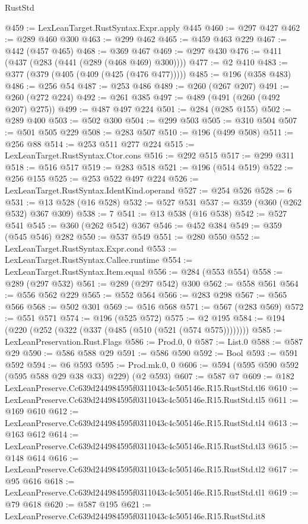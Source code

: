 \begin{lexlean}{RustStd}
\begin{coremodule}
@459 := LexLeanTarget.RustSyntax.Expr.apply @445
@460 := @297 @427
@462 := @289 @460 @300
@463 := @299 @462
@465 := @459 @463 @229
@467 := @442 (@457 @465)
@468 := @369 @467
@469 := @297 @430
@476 := @411 (@437 (@283 (@441 (@289 (@468 @469) @300))))
@477 := @2 @410
@483 := @377 (@379 (@405 (@409 (@425 (@476 @477)))))
@485 := @196 (@358 @483)
@486 := @256 @54
@487 := @253 @486
@489 := @260 (@267 @207)
@491 := @260 (@272 @224)
@492 := @261 @385
@497 := @489 (@491 (@260 (@492 @207) @275))
@499 := @487 @497 @224
@501 := @284 (@285 @155)
@502 := @289 @400
@503 := @502 @300
@504 := @299 @503
@505 := @310 @504
@507 := @501 @505 @229
@508 := @283 @507
@510 := @196 (@499 @508)
@511 := @256 @88
@514 := @253 @511 @277 @224
@515 := LexLeanTarget.RustSyntax.Ctor.cons
@516 := @292 @515
@517 := @299 @311
@518 := @516 @517
@519 := @283 @518
@521 := @196 (@514 @519)
@522 := @256 @155
@525 := @253 @522 @497 @224
@526 := LexLeanTarget.RustSyntax.IdentKind.operand
@527 := @254 @526
@528 := 6
@531 := @13 @528 (@16 @528)
@532 := @527 @531
@537 := @359 (@360 (@262 @532) @367 @309)
@538 := 7
@541 := @13 @538 (@16 @538)
@542 := @527 @541
@545 := @360 (@262 @542) @367
@546 := @452 @384
@549 := @359 (@545 @546) @282
@550 := @537 @549
@551 := @280 @550
@552 := LexLeanTarget.RustSyntax.Expr.cond
@553 := LexLeanTarget.RustSyntax.Callee.runtime
@554 := LexLeanTarget.RustSyntax.Item.equal
@556 := @284 (@553 @554)
@558 := @289 (@297 @532)
@561 := @289 (@297 @542) @300
@562 := @558 @561
@564 := @556 @562 @229
@565 := @552 @564
@566 := @283 @298
@567 := @565 @566
@568 := @502 @301
@569 := @516 @568
@571 := @567 (@283 @569)
@572 := @551 @571
@574 := @196 (@525 @572)
@575 := @2 @195
@584 := @194 (@220 (@252 (@322 (@337 (@485 (@510 (@521 (@574 @575))))))))
@585 := LexLeanPreservation.Rust.Flags
@586 := Prod.{0, 0}
@587 := List.{0}
@588 := @587 @29
@590 := @586 @588 @29
@591 := @586 @590
@592 := Bool
@593 := @591 @592
@594 := @6 @593
@595 := Prod.mk.{0, 0}
@606 := @594 (@595 @590 @592 (@595 @588 @29 @38 @33) @229) (@2 @593)
@607 := @587 @7
@609 := @182 LexLeanPreserve.Cc639d244984595f0311043c4c505146e.R15.RustStd.tl6
@610 := LexLeanPreserve.Cc639d244984595f0311043c4c505146e.R15.RustStd.tl5
@611 := @169 @610
@612 := LexLeanPreserve.Cc639d244984595f0311043c4c505146e.R15.RustStd.tl4
@613 := @163 @612
@614 := LexLeanPreserve.Cc639d244984595f0311043c4c505146e.R15.RustStd.tl3
@615 := @148 @614
@616 := LexLeanPreserve.Cc639d244984595f0311043c4c505146e.R15.RustStd.tl2
@617 := @95 @616
@618 := LexLeanPreserve.Cc639d244984595f0311043c4c505146e.R15.RustStd.tl1
@619 := @79 @618
@620 := @587 @195
@621 := LexLeanPreserve.Cc639d244984595f0311043c4c505146e.R15.RustStd.it8

\end{coremodule}
\end{lexlean}
